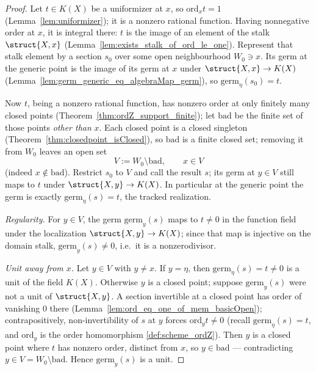 \begin{proof}
  \leanok
  Let \(t \in K(X)\) be a uniformizer at \(x\), so \(\mathrm{ord}_x t = 1\)
  (Lemma~\ref{lem:uniformizer}); it is a nonzero rational function. Having nonnegative order at
  \(x\), it is integral there: \(t\) is the image of an element of the stalk \(\struct{X,x}\)
  (Lemma~\ref{lem:exists_stalk_of_ord_le_one}). Represent that stalk element by a section \(s_0\)
  over some open neighbourhood \(W_0 \ni x\). Its germ at the generic point is the image of its
  germ at \(x\) under \(\struct{X,x} \to K(X)\) (Lemma~\ref{lem:germ_generic_eq_algebraMap_germ}),
  so \(\mathrm{germ}_\eta(s_0) = t\).

  Now \(t\), being a nonzero rational function, has nonzero order at only finitely many closed
  points (Theorem~\ref{thm:ordZ_support_finite}); let \(\mathrm{bad}\) be the finite set of those
  points \emph{other than} \(x\). Each closed point is a closed singleton
  (Theorem~\ref{thm:closedpoint_isClosed}), so \(\mathrm{bad}\) is a finite closed set; removing it
  from \(W_0\) leaves an open set
  \[
    V := W_0 \setminus \mathrm{bad}, \qquad x \in V
  \]
  (indeed \(x \notin \mathrm{bad}\)). Restrict \(s_0\) to \(V\) and call the result \(s\); its germ
  at \(y \in V\) still maps to \(t\) under \(\struct{X,y} \to K(X)\). In particular at the generic
  point the germ is exactly \(\mathrm{germ}_\eta(s) = t\), the tracked realization.

  \emph{Regularity.} For \(y \in V\), the germ \(\mathrm{germ}_y(s)\) maps to \(t \neq 0\) in the
  function field under the localization \(\struct{X,y} \to K(X)\); since that map is injective on
  the domain stalk, \(\mathrm{germ}_y(s) \neq 0\), i.e.\ it is a nonzerodivisor.

  \emph{Unit away from \(x\).} Let \(y \in V\) with \(y \neq x\). If \(y = \eta\), then
  \(\mathrm{germ}_\eta(s) = t \neq 0\) is a unit of the field \(K(X)\). Otherwise \(y\) is a closed
  point; suppose \(\mathrm{germ}_y(s)\) were not a unit of \(\struct{X,y}\). A section invertible at
  a closed point has order of vanishing \(0\) there (Lemma~\ref{lem:ord_eq_one_of_mem_basicOpen});
  contrapositively, non-invertibility of \(s\) at \(y\) forces \(\mathrm{ord}_y t \neq 0\)
  (recall \(\mathrm{germ}_\eta(s) = t\), and \(\mathrm{ord}_y\) is the order homomorphism
  \ref{def:scheme_ordZ}). Then \(y\) is a closed point where \(t\) has nonzero order, distinct from
  \(x\), so \(y \in \mathrm{bad}\) --- contradicting \(y \in V = W_0 \setminus \mathrm{bad}\). Hence
  \(\mathrm{germ}_y(s)\) is a unit.
\end{proof}

